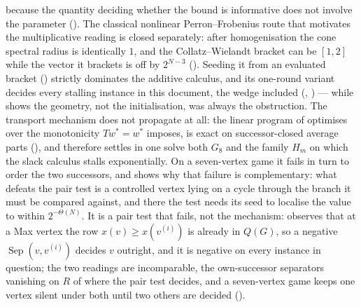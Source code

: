 \documentclass[11pt]{article}
\theoremstyle{plain}
\theoremstyle{definition}
\begin{document}
because the quantity deciding whether the bound is informative does not
involve the parameter (). The classical nonlinear
Perron--Frobenius route that motivates the multiplicative reading is
closed separately: after homogenisation the cone spectral radius is
identically $1$, and the Collatz--Wielandt bracket can be $[1,2]$ while
the vector it brackets is off by $2^{N-3}$ (). Seeding it from an evaluated bracket
() strictly dominates the additive calculus, and its
one-round variant decides every stalling instance in this document, the
wedge included (, ) --- while
 shows the geometry, not the initialisation, was
always the obstruction. The transport mechanism does not propagate at all:
the linear program of  optimises over the monotonicity
$Tw^\ast=w^\ast$ imposes, is exact on successor-closed average parts
(), and therefore settles in one solve both
$G_8$ and the family $H_m$ on which the slack calculus stalls
exponentially. On a seven-vertex game it fails in turn to order the two
successors, and  shows why that failure is
complementary: what defeats the pair test is a controlled vertex lying on a
cycle through the branch it must be compared against, and there the test needs
its seed to localise the value to within $2^{-\Theta(N)}$. It is a pair test
that fails, not the mechanism:  observes that at a Max
vertex the row $x(v)\ge x(v^{(i)})$ is already in $Q(G)$, so a negative
$\operatorname{Sep}(v,v^{(i)})$ decides $v$ outright, and it is negative on
every instance in question; the two readings are incomparable, the
own-successor separators vanishing on $R$ of  where the
pair test decides, and a seven-vertex game keeps one vertex silent under
both until two others are decided ().
\end{document}
